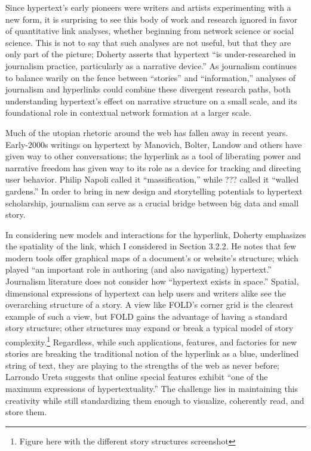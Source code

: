 Since hypertext's early pioneers were writers and artists experimenting with a new form, it is surprising to see this body of work and research ignored in favor of quantitative link analyses, whether beginning from network science or social science. This is not to say that such analyses are not useful, but that they are only part of the picture; Doherty asserts that hypertext ``is under-researched in journalism practice, particularly as a narrative device.''\autocite{doherty_hypertext_2014} As journalism continues to balance warily on the fence between ``stories'' and ``information,'' analyses of journalism and hyperlinks could combine these divergent research paths, both understanding hypertext's effect on narrative structure on a small scale, and its foundational role in contextual network formation at a larger scale.

Much of the utopian rhetoric around the web has fallen away in recent years. Early-2000s writings on hypertext by Manovich, Bolter, Landow and others have given way to other conversations; the hyperlink as a tool of liberating power and narrative freedom has given way to its role as a device for tracking and directing user behavior. Philip Napoli called it ``massification,'' while ??? called it ``walled gardens.'' In order to bring in new design and storytelling potentials to hypertext scholarship, journalism can serve as a crucial bridge between big data and small story.

In considering new models and interactions for the hyperlink, Doherty emphasizes the spatiality of the link, which I considered in Section 3.2.2. He notes that few modern tools offer graphical maps of a document's or website's structure; which played ``an important role in authoring (and also navigating) hypertext.''\autocite{doherty_hypertext_2013} Journalism literature does not consider how ``hypertext exists in space.''\autocite{doherty_hypertext_2013} Spatial, dimensional expressions of hypertext can help users and writers alike see the overarching structure of a story. A view like FOLD's corner grid is the clearest example of such a view, but FOLD gains the advantage of having a standard story structure; other structures may expand or break a typical model of story complexity.\footnote{Figure here with the different story structures screenshot} Regardless, while such applications, features, and factories for new stories are breaking the traditional notion of the hyperlink as a blue, underlined string of text, they are playing to the strengths of the web as never before; Larrondo Ureta suggests that online special features exhibit ``one of the maximum expressions of hypertextuality.''\autocite{doherty_hypertext_2014, ureta_2011} The challenge lies in maintaining this creativity while still standardizing them enough to visualize, coherently read, and store them.


